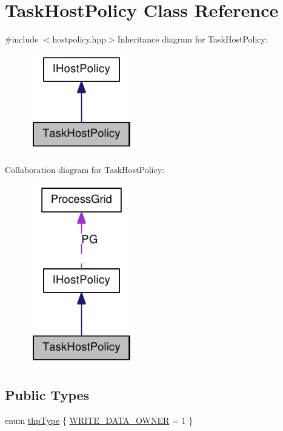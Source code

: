 \hypertarget{class_task_host_policy}{
\section{TaskHostPolicy Class Reference}
\label{class_task_host_policy}
}


{\ttfamily \#include $<$hostpolicy.hpp$>$}Inheritance diagram for TaskHostPolicy:\nopagebreak
\begin{figure}[H]
\begin{center}
\leavevmode
\includegraphics[width=130pt]{class_task_host_policy__inherit__graph}
\end{center}
\end{figure}
Collaboration diagram for TaskHostPolicy:\nopagebreak
\begin{figure}[H]
\begin{center}
\leavevmode
\includegraphics[width=130pt]{class_task_host_policy__coll__graph}
\end{center}
\end{figure}
\subsection*{Public Types}
\begin{DoxyCompactItemize}
\item 
enum \hyperlink{class_task_host_policy_a6b46066c98977d804c0d8e4b5f999a65}{thpType} \{ \hyperlink{class_task_host_policy_a6b46066c98977d804c0d8e4b5f999a65a0d391edf9d8abeca77d046c726d0ca8e}{WRITE\_\-DATA\_\-OWNER} = 1
 \}
\end{DoxyCompactItemize}
